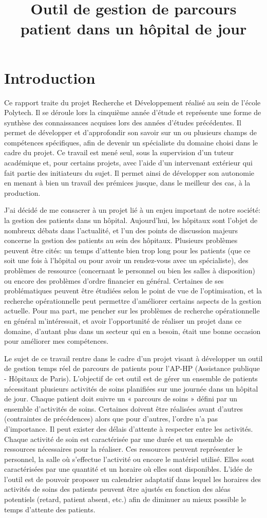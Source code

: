 \documentclass[noposter]{polytech/polytech}
\title{Outil de gestion de parcours patient dans un hôpital de jour}
\begin{document}
\chapter*{Introduction}

Ce rapport traite du projet Recherche et Développement réalisé au sein de l'école Polytech. Il se déroule lors la cinquième année d'étude et représente une forme de synthèse des connaissances acquises lors des années d’études précédentes. Il permet de développer et d'approfondir son savoir sur un ou plusieurs champs de compétences spécifiques, afin de devenir un spécialiste du domaine choisi dans le cadre du projet. Ce travail est mené seul, sous la supervision d'un tuteur académique et, pour certains projets, avec l'aide d'un intervenant extérieur qui fait partie des initiateurs du sujet. Il permet ainsi de développer son autonomie en menant à bien un travail des prémices jusque, dans le meilleur des cas, à la production.

J'ai décidé de me consacrer à un projet lié à un enjeu important de notre société: la gestion des patients dans un hôpital. Aujourd'hui, les hôpitaux sont l'objet de nombreux débats dans l'actualité, et l'un des points de discussion majeurs concerne la gestion des patients au sein des hôpitaux. Plusieurs problèmes peuvent être cités: un temps d'attente bien trop long pour les patients (que ce soit une fois à l'hôpital ou pour avoir un rendez-vous avec un spécialiste), des problèmes de ressource (concernant le personnel ou bien les salles à disposition) ou encore des problèmes d'ordre financier en général. Certaines de ses problématiques peuvent être étudiées selon le point de vue de l'optimisation, et la recherche opérationnelle peut permettre d'améliorer certains aspects de la gestion actuelle. Pour ma part, me pencher sur les problèmes de recherche opérationnelle en général m'intéressait, et avoir l'opportunité de réaliser un projet dans ce domaine, d'autant plus dans un secteur qui en a besoin, était une bonne occasion pour améliorer mes compétences.

Le sujet de ce travail rentre dans le cadre d'un projet visant à développer un outil de gestion temps réel de parcours de patients pour l’AP-HP (Assistance publique - Hôpitaux de Paris). L'objectif de cet outil est de gérer un ensemble de patients nécessitant plusieurs activités de soins planifiées sur une journée dans un hôpital de jour. Chaque patient doit suivre un « parcours de soins » défini par un ensemble d'activités de soins. Certaines doivent être réalisées avant d'autres (contraintes de précédences) alors que pour d'autres, l'ordre n'a pas d'importance. Il peut exister des délais d'attente à respecter entre les activités. Chaque activité de soin est caractérisée par une durée et un ensemble de ressources nécessaires pour la réaliser. Ces ressources peuvent représenter le personnel, la salle où s'effectue l'activité ou encore le matériel utilisé. Elles sont caractérisées par une quantité et un horaire où elles sont disponibles. L'idée de l'outil est de pouvoir proposer un calendrier adaptatif dans lequel les horaires des activités de soins des patients peuvent être ajustés en fonction des aléas potentiels (retard, patient absent, etc.) afin de diminuer au mieux possible le temps d'attente des patients.
\end{document}
